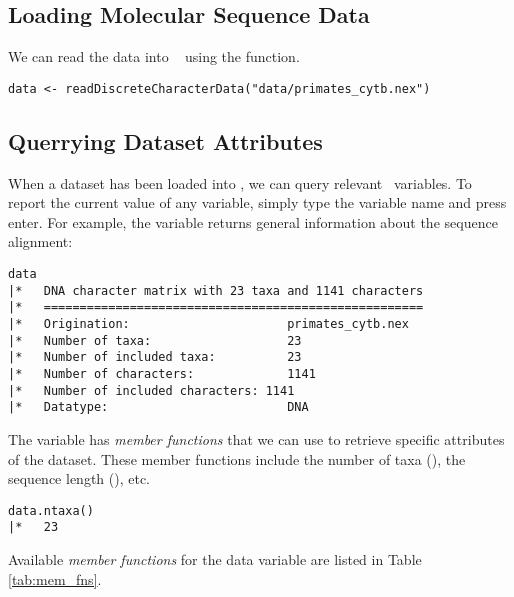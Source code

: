 \subsection{Loading Molecular Sequence Data}
We can read the data into \RevBayes~ using the  function. 
{\tt \begin{snugshade*}
\begin{lstlisting}
data <- readDiscreteCharacterData("data/primates_cytb.nex")
\end{lstlisting}
\end{snugshade*}}

\subsection{Querrying Dataset Attributes}
When a dataset has been loaded into \RevBayes, we can query relevant \Rev~variables. 
To report the current value of any variable, simply type the variable name and press enter. 
For example, the  variable returns general information about the sequence alignment:
{\tt \begin{snugshade*}
\begin{lstlisting}
data
|*   DNA character matrix with 23 taxa and 1141 characters
|*   =====================================================
|*   Origination:                      primates_cytb.nex
|*   Number of taxa:                   23
|*   Number of included taxa:          23
|*   Number of characters:             1141
|*   Number of included characters: 1141
|*   Datatype:                         DNA
\end{lstlisting}
\end{snugshade*}}

The  variable has \textit{member functions} that we can use to retrieve specific attributes of the dataset. 
These member functions include the number of taxa (), the sequence length (), etc.
{\tt \begin{snugshade*}
\begin{lstlisting}
data.ntaxa()
|*   23
\end{lstlisting}
\end{snugshade*}}

Available \textit{member functions} for the data variable are listed in Table \ref{tab:mem_fns}.


